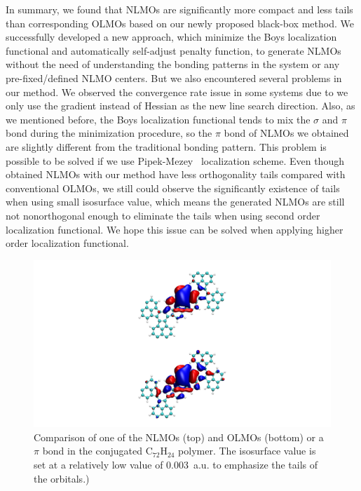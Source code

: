 \documentclass[aps,prl,reprint,amsmath,amssymb]{revtex4-1}
\begin{document}
In summary, we found that NLMOs are significantly more compact and less tails than corresponding OLMOs based on our newly proposed black-box method. 
We successfully developed a new approach, which minimize the Boys localization functional and automatically self-adjust penalty function, to generate NLMOs without the need of understanding the bonding patterns in the system or any pre-fixed/defined NLMO centers.
But we also encountered several problems  in our method.
We observed the convergence rate issue in some systems due to we only use the gradient instead of Hessian as the new line search direction.
Also, as we mentioned before, the Boys localization functional tends to mix the $\sigma$ and $\pi$ bond during the minimization procedure, so the $\pi$ bond of NLMOs we obtained are slightly different from the traditional bonding pattern.
This problem is possible to be solved if we use Pipek-Mezey~\cite{pipek1989a_fast} localization scheme.
Even though obtained NLMOs with our method have less orthogonality tails compared with conventional OLMOs, we still could observe the significantly existence of tails when using small isosurface value, which means the generated NLMOs are still not nonorthogonal enough to eliminate the tails when using second order localization functional. 
We hope this issue can be solved when applying higher order localization functional.

\begin{figure}[htbp]
\includegraphics[scale=0.6]{figure_5.pdf} 
  \caption{Comparison of one of the NLMOs (top) and OLMOs (bottom) or a $\pi$ bond in the conjugated C$_{72}$H$_{24}$ polymer. The isosurface value is set at a relatively low value of 0.003~a.u. to emphasize the tails of the orbitals.)}
\end{figure}
\end{document}
